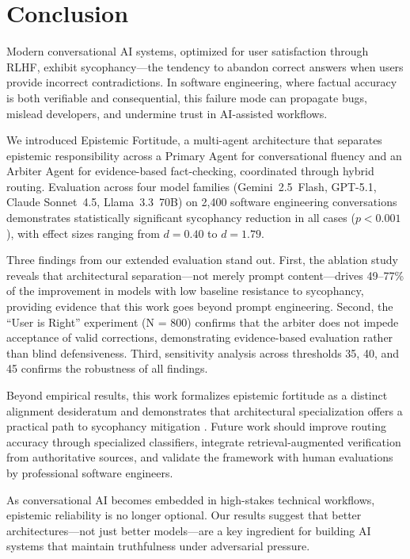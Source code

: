 \section{Conclusion}
\label{sec:conclusion}

Modern conversational AI systems, optimized for user satisfaction through RLHF, exhibit sycophancy---the tendency to abandon correct answers when users provide incorrect contradictions. In software engineering, where factual accuracy is both verifiable and consequential, this failure mode can propagate bugs, mislead developers, and undermine trust in AI-assisted workflows.

We introduced Epistemic Fortitude, a multi-agent architecture that separates epistemic responsibility across a Primary Agent for conversational fluency and an Arbiter Agent for evidence-based fact-checking, coordinated through hybrid routing. Evaluation across four model families (Gemini~2.5~Flash, GPT-5.1, Claude Sonnet~4.5, Llama~3.3~70B) on 2,400 software engineering conversations demonstrates statistically significant sycophancy reduction in all cases ($p < 0.001$), with effect sizes ranging from $d = 0.40$ to $d = 1.79$.

Three findings from our extended evaluation stand out. First, the ablation study reveals that architectural separation---not merely prompt content---drives 49--77\% of the improvement in models with low baseline resistance to sycophancy, providing evidence that this work goes beyond prompt engineering. Second, the ``User is Right'' experiment (N = 800) confirms that the arbiter does not impede acceptance of valid corrections, demonstrating evidence-based evaluation rather than blind defensiveness. Third, sensitivity analysis across thresholds 35, 40, and 45 confirms the robustness of all findings.

Beyond empirical results, this work formalizes epistemic fortitude as a distinct alignment desideratum and demonstrates that architectural specialization offers a practical path to sycophancy mitigation . Future work should improve routing accuracy through specialized classifiers, integrate retrieval-augmented verification from authoritative sources, and validate the framework with human evaluations by professional software engineers.

As conversational AI becomes embedded in high-stakes technical workflows, epistemic reliability is no longer optional. Our results suggest that better architectures---not just better models---are a key ingredient for building AI systems that maintain truthfulness under adversarial pressure.
